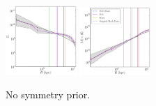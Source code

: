 \documentclass[galley,usenatbib]{mn2e}
\begin{document}
\begin{figure}
\includegraphics[width=0.24\textwidth]{BCExtendedDoubleR1-nosymm_tms-b.pdf}
\includegraphics[width=0.24\textwidth]{BCExtendedDoubleR1-nosymm_tms-c.pdf}
\caption{No symmetry prior.}
\label{}
\end{figure}
\end{document}
